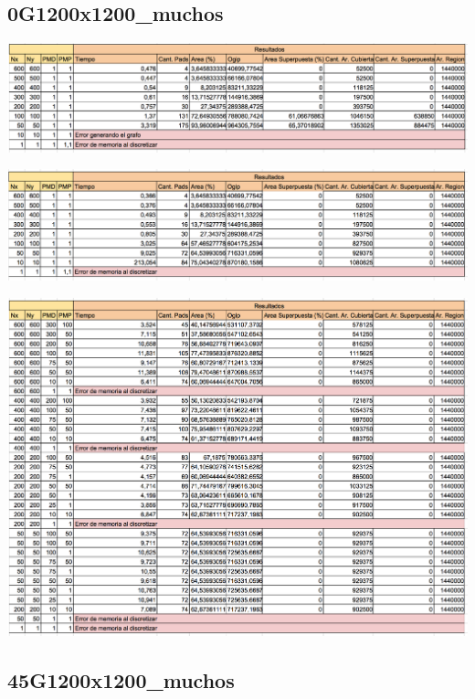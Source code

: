 \subsection{0G1200x1200\_muchos}


\begin{center}
\includegraphics[width=1\textwidth]{imagenes/S_0G1200x1200_muchos}
\end{center}

\begin{center}
\includegraphics[width=1\textwidth]{imagenes/G_0G1200x1200_muchos}
\end{center}

\begin{center}
\includegraphics[width=1\textwidth]{imagenes/GML_0G1200x1200_muchos}
\end{center}

\subsection{45G1200x1200\_muchos}

